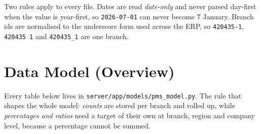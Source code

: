 \documentclass[11pt,a4paper]{article}
\newcommand{\file}[1]{\texttt{\small #1}}
\begin{document}
Two rules apply to every file. Dates are read \emph{date-only} and never parsed
day-first when the value is year-first, so \file{2026-07-01} can never become 7 January.
Branch ids are normalised to the underscore form used across the ERP, so
\file{420435-1}, \file{420435 1} and \file{420435\_1} are one branch.

\section{Data Model (Overview)}

Every table below lives in \file{server/app/models/pms\_model.py}. The rule that shapes
the whole model: \emph{counts} are stored per branch and rolled up, while
\emph{percentages and ratios} need a target of their own at branch, region and company
level, because a percentage cannot be summed.
\end{document}
